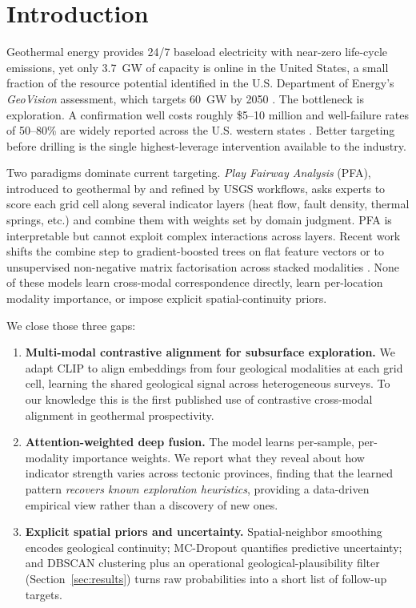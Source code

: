 \documentclass[review,12pt]{elsarticle}
\begin{document}
\linenumbers

\section{Introduction}
\label{sec:intro}

Geothermal energy provides 24/7 baseload electricity with near-zero life-cycle emissions, yet only \SI{3.7}{\giga\watt} of capacity is online in the United States, a small fraction of the resource potential identified in the U.S. Department of Energy's \emph{GeoVision} assessment, which targets \SI{60}{\giga\watt} by 2050 \citep{DOE2019}. The bottleneck is exploration. A confirmation well costs roughly \$5--10 million and well-failure rates of 50--80\% are widely reported across the U.S. western states \citep{Williams2008,Faulds2020}. Better targeting before drilling is the single highest-leverage intervention available to the industry.

Two paradigms dominate current targeting. \emph{Play Fairway Analysis} (PFA), introduced to geothermal by \citet{Faulds2020} and refined by USGS workflows, asks experts to score each grid cell along several indicator layers (heat flow, fault density, thermal springs, etc.) and combine them with weights set by domain judgment. PFA is interpretable but cannot exploit complex interactions across layers. Recent work shifts the combine step to gradient-boosted trees on flat feature vectors \citep{Mordensky2025} or to unsupervised non-negative matrix factorisation across stacked modalities \citep{Vesselinov2022}. None of these models learn cross-modal correspondence directly, learn per-location modality importance, or impose explicit spatial-continuity priors.

We close those three gaps:

\begin{enumerate}
  \item \textbf{Multi-modal contrastive alignment for subsurface exploration.} We adapt CLIP \citep{Radford2021} to align embeddings from four geological modalities at each grid cell, learning the shared geological signal across heterogeneous surveys. To our knowledge this is the first published use of contrastive cross-modal alignment in geothermal prospectivity.
  \item \textbf{Attention-weighted deep fusion.} The model learns per-sample, per-modality importance weights. We report what they reveal about how indicator strength varies across tectonic provinces, finding that the learned pattern \emph{recovers known exploration heuristics}, providing a data-driven empirical view rather than a discovery of new ones.
  \item \textbf{Explicit spatial priors and uncertainty.} Spatial-neighbor smoothing encodes geological continuity; MC-Dropout quantifies predictive uncertainty; and DBSCAN clustering plus an operational geological-plausibility filter (Section~\ref{sec:results}) turns raw probabilities into a short list of follow-up targets.
\end{enumerate}
\end{document}
